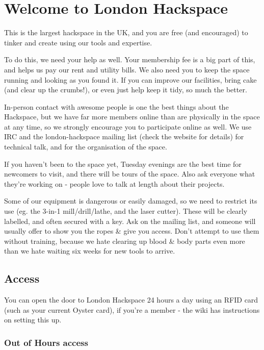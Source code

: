 \documentclass[12pt,a4paper]{book}
\begin{document}

\chapter{Welcome to London Hackspace}

This is the largest hackspace in the UK, and you are free (and encouraged) to tinker and create using our tools and expertise.

To do this, we need your help as well. Your membership fee is a big part of this, and helps us pay our rent and utility bills. We also need you to keep the space running and looking as you found it. If you can improve our facilities, bring cake (and clear up the crumbs!), or even just help keep it tidy, so much the better.

In-person contact with awesome people is one the best things about the Hackspace, but we have far more members online than are physically in the space at any time, so we strongly encourage you to participate online as well. We use IRC and the london-hackspace mailing list (check the website for details) for technical talk, and for the organisation of the space.

If you haven't been to the space yet, Tuesday evenings are the best time for newcomers to visit, and there will be tours of the space. Also ask everyone what they're working on - people love to talk at length about their projects.

Some of our equipment is dangerous or easily damaged, so we need to restrict its use (eg. the 3-in-1 mill/drill/lathe, and the laser cutter). These will be clearly labelled, and often secured with a key. Ask on the mailing list, and someone will usually offer to show you the ropes \& give you access. Don't attempt to use them without training, because we hate clearing up blood \& body parts even more than we hate waiting six weeks for new tools to arrive.

\section{Access}

You can open the door to London Hackspace 24 hours a day using an RFID card (such as your current Oyster card), if you're a member - the wiki has instructions on setting this up.

\subsection{Out of Hours access}
\end{document}
